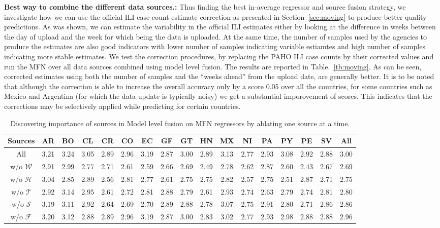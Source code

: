 {\noindent \textbf{Best way to combine the different data sources.: }} Thus finding the 
best in-average regressor and source fusion strategy, we investigate how we can use the 
official ILI case count estimate correction as presented in Section~\ref{sec:moving} to 
produce better quality predictions. As was shown, we can estimate the variability in the 
official ILI estimates either by looking at the difference in weeks between the day of upload 
and the week for which being the data is uploaded. At the same time, the number of samples used 
by the agencies to produce the estimates are also good indicators with lower number of samples
indicating variable estiamtes and high number of samples indicating more stable estimates. 
We test the correction procedures, by replacing the PAHO ILI case counts by their corrected values
and run the MFN over all data sources combined using model level fusion.
The results are reported in Table.~\ref{tb:moving}. As can be seen, corrected estimates 
using both the number of samples and 
the ``weeks ahead'' from the upload date, are generally better. It is to be noted that although
the correction is 
able to increase the overall accuracy only by a score 0.05 over all the countries, 
for some countries such as Mexico and Argentina (for which the data update is typically noisy) we get 
a substantial imporovement of scores. This indicates that the corrections may be selectively applied 
while predicting for certain countries. 



\begin{table}[tb!]
  \centering
  \caption{\label{tb:Ablation} Discovering importance of sources in Model level fusion on MFN 
  regressors by ablating one source at a time.}
\vspace{1em}
\begin{tabular}{|*{17}{c|}}
\hline
Sources & AR & BO & CL & CR & CO & EC & GF & GT & HN & MX & NI & PA & PY & PE & SV & All\\
\hline 
\hline
All               & 3.21& 3.24& 3.05& 2.89& 2.96& 3.19& 2.87& 3.00& 2.89& 3.13& 2.77& 2.93& 3.08& 2.92& 2.88& 3.00\\
w/o $\mathcal{W}$ & 2.91& 2.99& 2.77& 2.71& 2.61& 2.59& 2.66& 2.69& 2.49& 2.78& 2.62& 2.87& 2.60& 2.43& 2.67& 2.69  \\
w/o $\mathcal{H}$ & 3.04& 2.85& 2.89& 2.56& 2.81& 2.77& 2.61& 2.75& 2.75& 2.82& 2.57& 2.75& 2.51& 2.87& 2.71& 2.75  \\
w/o $\mathcal{T}$ & 2.92& 3.14& 2.95& 2.61& 2.72& 2.81& 2.88& 2.79& 2.61& 2.93& 2.74& 2.63& 2.79& 2.74& 2.81& 2.80  \\
w/o $\mathcal{S}$ & 3.19& 3.11& 2.92& 2.64& 2.69& 2.70& 2.89& 2.88& 2.78& 3.07& 2.75& 2.91& 2.80& 2.71& 2.86& 2.86  \\
w/o $\mathcal{F}$ & 3.20& 3.12& 2.88& 2.89& 2.96& 3.19& 2.87& 3.00& 2.83& 3.02& 2.77& 2.93& 2.98& 2.88& 2.88& 2.96  \\
\hline
\end{tabular}
\end{table}

